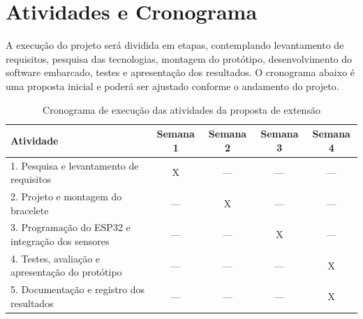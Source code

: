 \section{Atividades e Cronograma}
\label{sec:atividades-cronograma}

A execução do projeto será dividida em etapas, contemplando levantamento de requisitos, pesquisa das tecnologias, montagem do protótipo, desenvolvimento do software embarcado, testes e apresentação dos resultados. O cronograma abaixo é uma proposta inicial e poderá ser ajustado conforme o andamento do projeto.

\begin{table}[htb]
\centering
\small
\caption{Cronograma de execução das atividades da proposta de extensão}
\label{tab:cronograma}
\begin{tabular}{|p{5.5cm}|c|c|c|c|}
\hline
\textbf{Atividade} & \textbf{Semana 1} & \textbf{Semana 2} & \textbf{Semana 3} & \textbf{Semana 4} \\
\hline
1. Pesquisa e levantamento de requisitos & X & --- & --- & --- \\
\hline
2. Projeto e montagem do bracelete & --- & X & --- & --- \\
\hline
3. Programação do ESP32 e integração dos sensores & --- & --- & X & --- \\
\hline
4. Testes, avaliação e apresentação do protótipo & --- & --- & --- & X \\
\hline
5. Documentação e registro dos resultados & --- & --- & --- & X \\
\hline
\end{tabular}
\end{table}
